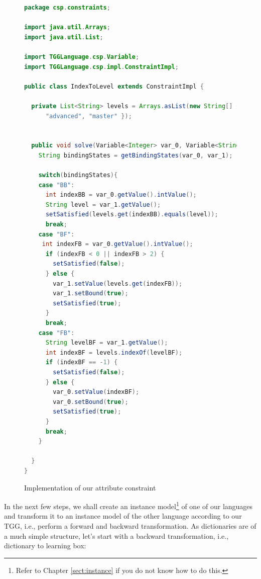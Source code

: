 \begin{figure}[htbp]
\begin{center}
\begin{lstlisting}[language=Java,backgroundcolor=\color{white}, keywordstyle={\bfseries\color{purple}}]
package csp.constraints;

import java.util.Arrays;
import java.util.List;

import TGGLanguage.csp.Variable;
import TGGLanguage.csp.impl.ConstraintImpl;

public class IndexToLevel extends ConstraintImpl {

  private List<String> levels = Arrays.asList(new String[] { "beginner",
      "advanced", "master" });


  public void solve(Variable<Integer> var_0, Variable<String> var_1){
    String bindingStates = getBindingStates(var_0, var_1);

    switch(bindingStates){
    case "BB":
      int indexBB = var_0.getValue().intValue();
      String level = var_1.getValue();
      setSatisfied(levels.get(indexBB).equals(level));
      break;
    case "BF":
     int indexFB = var_0.getValue().intValue();
      if (indexFB < 0 || indexFB > 2) {
        setSatisfied(false);
      } else {
        var_1.setValue(levels.get(indexFB));
        var_1.setBound(true);
        setSatisfied(true);
      }
      break;
    case "FB":
      String levelBF = var_1.getValue();
      int indexBF = levels.indexOf(levelBF);
      if (indexBF == -1) {
        setSatisfied(false);
      } else {
        var_0.setValue(indexBF);
        var_0.setBound(true);
        setSatisfied(true);
      }
      break;
    }

  }
}
\end{lstlisting}
  \caption{Implementation of our attribute constraint}
  \label{fig:indexToLevel}
\end{center}
\end{figure}

In the next few steps, we shall create an instance model\footnote{Refer to Chapter \ref{sect:instance} if you do not know how to do this.} of one of our languages and  transform it to an instance model of the other language according to our TGG, i.e., perform a forward and backward transformation.
As dictionaries are of a much simple structure, let's start with a backward transformation, i.e., dictionary to learning box:

